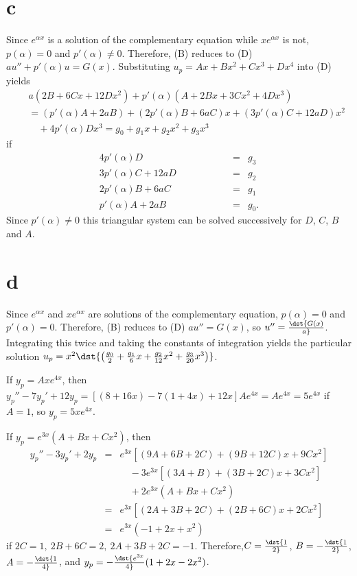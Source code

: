 \documentclass[dvips]{book}
\renewcommand{\exer}[1]{\par\medskip\;\noindent{\color{red}\bf #1.}}
\numberwithin{example}{section}
\numberwithin{equation}{section}
\numberwithin{theorem}{section}
\numberwithin{table}{section}
\numberwithin{figure}{section}
\begin{document}
\part{c}
Since $e^{\alpha x}$ is a solution of the complementary equation while
$xe^{\alpha x}$ is not, $p(\alpha)=0$ and $p'(\alpha)\ne0$. Therefore,
(B) reduces to  (D) $au''+p'(\alpha)u=G(x)$.
Substituting $u_p=Ax+Bx^2+Cx^3+Dx^4$ into (D) yields
\begin{eqnarray*}
&&a(2B+6Cx+12Dx^2)+p'(\alpha)(A+2Bx+3Cx^2+4Dx^3)\\
&&=(p'(\alpha)A+2aB)+(2p'(\alpha)B+6aC)x
+(3p'(\alpha)C +12aD)x^2\\  &&\quad+4p'(\alpha)Dx^3=
g_0+g_1x+g_2x^2+g_3x^3
\end{eqnarray*}
 if
$$
\begin{array}{rcr}
4p'(\alpha)D&=&g_3\\
3p'(\alpha)C+12aD&=&g_2\\
2p'(\alpha)B+6aC\phantom{+12aD}&=&g_1\\
p'(\alpha)A+2aB\phantom{+6aC+12aD}&=&g_0.
\end{array}
$$
Since $p'(\alpha)\ne0$ this triangular system can be solved
successively for $D$, $C$, $B$ and $A$.

\part{d}
Since $e^{\alpha x}$ and $xe^{\alpha x}$ are solutions of the
complementary equation,
 $p(\alpha)=0$ and $p'(\alpha)=0$. Therefore,
(B) reduces to  (D) $au''=G(x)$, so $u''=\dst{G(x)\over a}$.
Integrating this twice and taking the constants of integration yields
the particular solution $u_p=x^2\dst{\left({g_0\over2}+
{g_1\over6}x+{g_2\over12}x^2+{g_3\over20}x^3\right)}$.



\exer{5.4.32}
If $y_p=Axe^{4x}$, then
$y_p''-7y_p'+12y_p=[(8+16x)-7(1+4x)+12x]Ae^{4x}=Ae^{4x}=5e^{4x}$
if $A=1$, so $y_p=5xe^{4x}$.


\exer{5.4.34}
If $y_p=e^{3x}(A+Bx+Cx^2)$, then
\begin{eqnarray*}
y_p''-3y_p'+2y_p&=&e^{3x}[(9A+6B+2C)+(9B+12C)x+9Cx^2]\\
&&\quad-3e^{3x}[(3A+B)+(3B+2C)x+3Cx^2]\\ &&\quad+2e^{3x}(A+Bx+Cx^2)\\
&=&e^{3x}[(2A+3B+2C)+(2B+6C)x+2Cx^2]\\&=& e^{3x}(-1+2x+x^2)
\end{eqnarray*}
if $2C=1,\ 2B+6C=2,\ 2A+3B+2C= -1$. Therefore,$C=\dst{1\over2}$,
$B=-\dst{1\over2}$, $A=-\dst{1\over4}$, and
$y_p=-\dst{e^{3x}\over4}(1+2x-2x^2)$.
\end{document}
